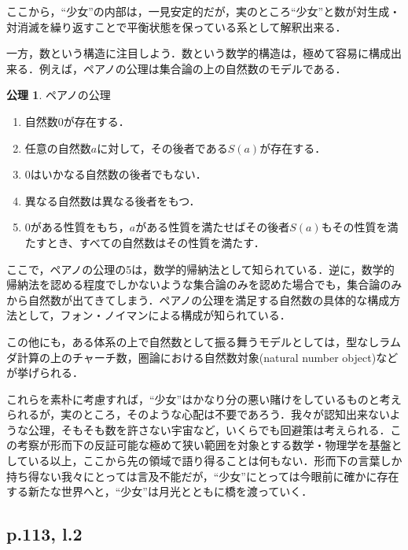\documentclass[10pt, a5paper, twoside]{jsarticle}
\theoremstyle{definition}
\newtheorem{axi}{公理}
\begin{document}
			ここから，“少女”の内部は，一見安定的だが，実のところ“少女”と数が対生成・対消滅を繰り返すことで平衡状態を保っている系として解釈出来る．

			一方，数という構造に注目しよう．数という数学的構造は，極めて容易に構成出来る．例えば，ペアノの公理は集合論の上の自然数のモデルである．

			\clearpage

			\begin{axi}

				ペアノの公理

				\begin{enumerate}
					\item 自然数$0$が存在する．

					\item 任意の自然数$a$に対して，その後者である$S(a)$が存在する．

					\item $0$はいかなる自然数の後者でもない．

					\item 異なる自然数は異なる後者をもつ．

					\item $0$がある性質をもち，$a$がある性質を満たせばその後者$S(a)$もその性質を満たすとき、すべての自然数はその性質を満たす．
				\end{enumerate}
				
			\end{axi}

			ここで，ペアノの公理の5は，数学的帰納法として知られている．逆に，数学的帰納法を認める程度でしかないような集合論のみを認めた場合でも，集合論のみから自然数が出てきてしまう．ペアノの公理を満足する自然数の具体的な構成方法として，フォン・ノイマンによる構成が知られている．

			この他にも，ある体系の上で自然数として振る舞うモデルとしては，型なしラムダ計算の上のチャーチ数，圏論における自然数対象(natural number object)などが挙げられる．

			これらを素朴に考慮すれば，“少女”はかなり分の悪い賭けをしているものと考えられるが，実のところ，そのような心配は不要であろう．我々が認知出来ないような公理，そもそも数を許さない宇宙など，いくらでも回避策は考えられる．この考察が形而下の反証可能な極めて狭い範囲を対象とする数学・物理学を基盤としている以上，ここから先の領域で語り得ることは何もない．形而下の言葉しか持ち得ない我々にとっては言及不能だが，“少女”にとっては今眼前に確かに存在する新たな世界へと，“少女”は月光とともに橋を渡っていく．

		\subsection{p.113, l.2}
\end{document}
